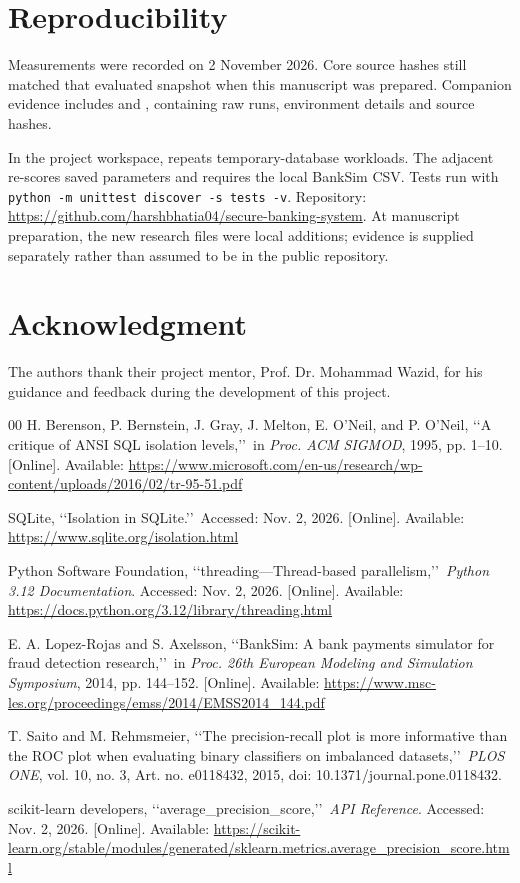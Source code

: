 \documentclass[conference]{IEEEtran}
\begin{document}
\section*{Reproducibility}
Measurements were recorded on 2 November 2026. Core source hashes still matched that evaluated snapshot when this manuscript was prepared. Companion evidence includes  and , containing raw runs, environment details and source hashes.

In the project workspace,  repeats temporary-database workloads. The adjacent  re-scores saved parameters and requires the local BankSim CSV. Tests run with \texttt{python -m unittest discover -s tests -v}. Repository:
\url{https://github.com/harshbhatia04/secure-banking-system}.
At manuscript preparation, the new research files were local additions; evidence is supplied separately rather than assumed to be in the public repository.

\section*{Acknowledgment}
The authors thank their project mentor, Prof. Dr. Mohammad Wazid, for his guidance and feedback during the development of this project.

\begin{thebibliography}{00}
H. Berenson, P. Bernstein, J. Gray, J. Melton, E. O'Neil, and P. O'Neil,
\lq\lq A critique of ANSI SQL isolation levels,\rq\rq\
in \emph{Proc. ACM SIGMOD}, 1995, pp. 1--10.
[Online]. Available:
\url{https://www.microsoft.com/en-us/research/wp-content/uploads/2016/02/tr-95-51.pdf}

SQLite, \lq\lq Isolation in SQLite.\rq\rq\
Accessed: Nov. 2, 2026. [Online]. Available:
\url{https://www.sqlite.org/isolation.html}

Python Software Foundation, \lq\lq threading---Thread-based parallelism,\rq\rq\
\emph{Python 3.12 Documentation}. Accessed: Nov. 2, 2026.
[Online]. Available: \url{https://docs.python.org/3.12/library/threading.html}

\bibitem{banksim}
E. A. Lopez-Rojas and S. Axelsson,
\lq\lq BankSim: A bank payments simulator for fraud detection research,\rq\rq\
in \emph{Proc. 26th European Modeling and Simulation Symposium},
2014, pp. 144--152. [Online]. Available:
\url{https://www.msc-les.org/proceedings/emss/2014/EMSS2014_144.pdf}

\bibitem{saito}
T. Saito and M. Rehmsmeier,
\lq\lq The precision-recall plot is more informative than the ROC plot when
evaluating binary classifiers on imbalanced datasets,\rq\rq\
\emph{PLOS ONE}, vol. 10, no. 3, Art. no. e0118432, 2015,
doi: 10.1371/journal.pone.0118432.

\bibitem{ap}
scikit-learn developers, \lq\lq average\_precision\_score,\rq\rq\
\emph{API Reference}. Accessed: Nov. 2, 2026. [Online]. Available:
\url{https://scikit-learn.org/stable/modules/generated/sklearn.metrics.average_precision_score.html}
\end{thebibliography}
\end{document}
